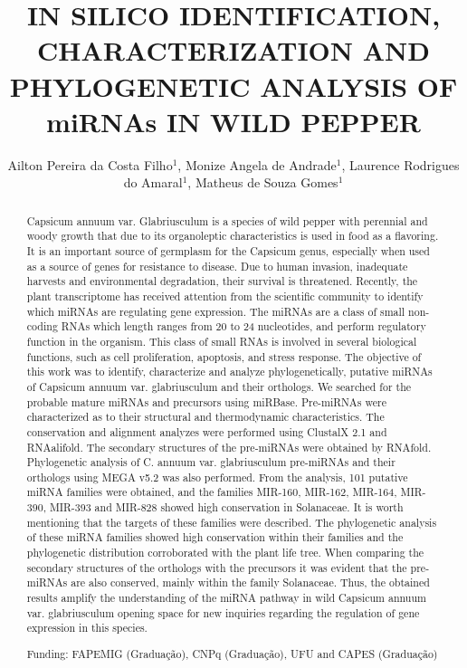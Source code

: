 \documentclass[twoside]{article}
\title{\vspace{-15mm}\fontsize{24pt}{10pt}\selectfont\textbf{IN SILICO IDENTIFICATION, CHARACTERIZATION AND PHYLOGENETIC ANALYSIS OF miRNAs IN WILD PEPPER}} %
\author{Ailton Pereira da Costa Filho$^1$, Monize Angela de Andrade$^1$, Laurence Rodrigues do Amaral$^1$, Matheus de Souza Gomes$^1$}
\affil{1 UFU\\ }
\date{}
\begin{document}
\maketitle %

\thispagestyle{fancy} %


\begin{abstract}
Capsicum annuum var. Glabriusculum is a species of wild pepper with perennial and woody growth that due to its organoleptic characteristics is used in food as a flavoring. It is an important source of germplasm for the Capsicum genus, especially when used as a source of genes for resistance to disease. Due to human invasion, inadequate harvests and environmental degradation, their survival is threatened. Recently, the plant transcriptome has received attention from the scientific community to identify which miRNAs are regulating gene expression. The miRNAs are a class of small non-coding RNAs which length ranges from 20 to 24 nucleotides, and perform regulatory function in the organism. This class of small RNAs is involved in several biological functions, such as cell proliferation, apoptosis, and stress response. The objective of this work was to identify, characterize and analyze phylogenetically, putative miRNAs of Capsicum annuum var. glabriusculum and their orthologs. We searched for the probable mature miRNAs and precursors using miRBase. Pre-miRNAs were characterized as to their structural and thermodynamic characteristics. The conservation and alignment analyzes were performed using ClustalX 2.1 and RNAalifold. The secondary structures of the pre-miRNAs were obtained by RNAfold. Phylogenetic analysis of C. annuum var. glabriusculum pre-miRNAs and their orthologs using MEGA v5.2 was also performed. From the analysis, 101 putative miRNA families were obtained, and the families MIR-160, MIR-162, MIR-164, MIR-390, MIR-393 and MIR-828 showed high conservation in Solanaceae. It is worth mentioning that the targets of these families were described. The phylogenetic analysis of these miRNA families showed high conservation within their families and the phylogenetic distribution corroborated with the plant life tree. When comparing the secondary structures of the orthologs with the precursors it was evident that the pre-miRNAs are also conserved, mainly within the family Solanaceae. Thus, the obtained results amplify the understanding of the miRNA pathway in wild Capsicum annuum var. glabriusculum opening space for new inquiries regarding the regulation of gene expression in this species.

Funding: FAPEMIG (Gradua\c{c}\~ao), CNPq (Gradua\c{c}\~ao), UFU and CAPES (Gradua\c{c}\~ao)
\end{abstract}
\end{document}
